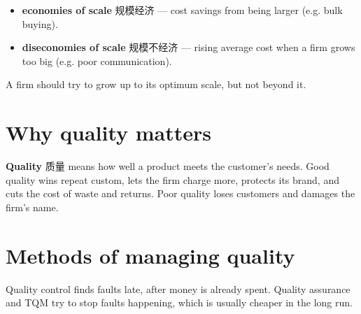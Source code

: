 \documentclass[11pt]{article}
\begin{document}
\begin{itemize}
\item \textbf{economies of scale} 规模经济 — cost savings from being larger (e.g. bulk buying).

\item \textbf{diseconomies of scale} 规模不经济 — rising average cost when a firm grows too big (e.g. poor communication).

\end{itemize}

A firm should try to grow up to its optimum scale, but not beyond it.

\section*{Why quality matters}

\textbf{Quality} 质量 means how well a product meets the customer's needs. Good quality wins repeat custom, lets the firm charge more, protects its brand, and cuts the cost of waste and returns. Poor quality loses customers and damages the firm's name.

\section*{Methods of managing quality}

\begin{center}
\end{center}

Quality control finds faults late, after money is already spent. Quality assurance and TQM try to stop faults happening, which is usually cheaper in the long run.
\end{document}
